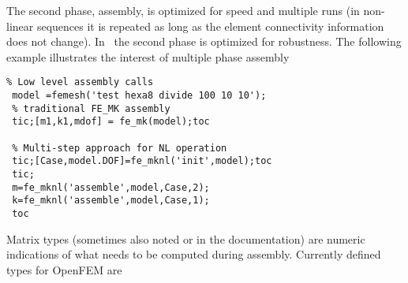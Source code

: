 The second phase, assembly, is optimized for speed and multiple runs (in non-linear sequences it is repeated as long as the element connectivity information does not change). In \femk\ the second phase is optimized for robustness.  The following example illustrates the interest of multiple phase assembly

\begin{verbatim}
% Low level assembly calls
 model =femesh('test hexa8 divide 100 10 10');
 % traditional FE_MK assembly
 tic;[m1,k1,mdof] = fe_mk(model);toc

 % Multi-step approach for NL operation
 tic;[Case,model.DOF]=fe_mknl('init',model);toc
 tic;
 m=fe_mknl('assemble',model,Case,2);
 k=fe_mknl('assemble',model,Case,1);
 toc
\end{verbatim}%



Matrix types (sometimes also noted  or  in the documentation) are numeric indications of what needs to be computed during assembly. Currently defined types for OpenFEM are

